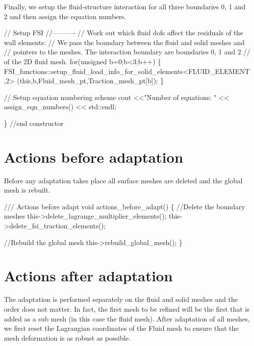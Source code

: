 Finally, we setup the fluid-\/structure interaction for all three boundaries 0, 1 and 2 and then assign the equation numbers.


\begin{DoxyCodeInclude}

 \textcolor{comment}{// Setup FSI}
 \textcolor{comment}{//----------}
 \textcolor{comment}{// Work out which fluid dofs affect the residuals of the wall elements:}
 \textcolor{comment}{// We pass the boundary between the fluid and solid meshes and }
 \textcolor{comment}{// pointers to the meshes. The interaction boundary are boundaries 0, 1 and 2}
 \textcolor{comment}{// of the 2D fluid mesh.}
 \textcolor{keywordflow}{for}(\textcolor{keywordtype}{unsigned} b=0;b<3;b++)
  \{
   FSI\_functions::setup\_fluid\_load\_info\_for\_solid\_elements<FLUID\_ELEMENT,2>
    (\textcolor{keyword}{this},b,Fluid\_mesh\_pt,Traction\_mesh\_pt[b]);
  \}
   
 \textcolor{comment}{// Setup equation numbering scheme}
 cout <<\textcolor{stringliteral}{"Number of equations: "} << assign\_eqn\_numbers() << std::endl; 
 
\} \textcolor{comment}{//end constructor}

\end{DoxyCodeInclude}




 

\hypertarget{index_actions_before}{}\section{Actions before adaptation}\label{index_actions_before}
Before any adaptation takes place all surface meshes are deleted and the global mesh is rebuilt.

 
\begin{DoxyCodeInclude}
 \textcolor{comment}{/// Actions before adapt}
 \textcolor{keywordtype}{void} actions\_before\_adapt()
  \{
   \textcolor{comment}{//Delete the boundary meshes}
   this->delete\_lagrange\_multiplier\_elements();
   this->delete\_fsi\_traction\_elements();

   \textcolor{comment}{//Rebuild the global mesh}
   this->rebuild\_global\_mesh();
  \}

\end{DoxyCodeInclude}




 

\hypertarget{index_actions_after}{}\section{Actions after adaptation}\label{index_actions_after}
The adaptation is performed separately on the fluid and solid meshes and the order does not matter. In fact, the first mesh to be refined will be the first that is added as a sub mesh (in this case the fluid mesh). After adaptation of all meshes, we first reset the Lagrangian coordinates of the Fluid mesh to ensure that the mesh deformation is as robust as possible.



